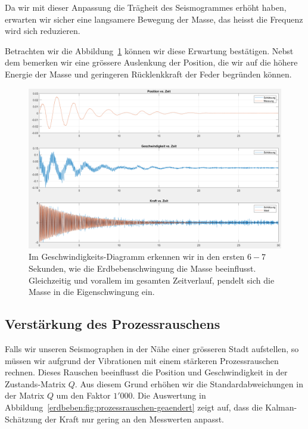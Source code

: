 Da wir mit dieser Anpassung die Trägheit des Seismogrammes erhöht haben, erwarten wir sicher eine langsamere Bewegung der Masse, das heisst die Frequenz wird sich reduzieren.

Betrachten wir die Abbildung~\ref{erdbeben:fig:systemparameter-geaendert} können wir diese Erwartung bestätigen.
Nebst dem bemerken wir eine grössere Auslenkung der Position, die wir auf die höhere Energie der Masse und geringeren Rücklenkkraft der Feder begründen können.

\begin{figure}
	\begin{center}
		\includegraphics[width=\linewidth,keepaspectratio]{papers/erdbeben/Systemparameter_geaendert_2.PNG}
		\caption{Im Geschwindigkeits-Diagramm erkennen wir in den ersten $6-7$ Sekunden, wie die Erdbebenschwingung die Masse beeinflusst. Gleichzeitig und vorallem im gesamten Zeitverlauf, pendelt sich die Masse in die Eigenschwingung ein.}
    \label{erdbeben:fig:systemparameter-geaendert}
	\end{center}
\end{figure}


\subsection{Verstärkung des Prozessrauschens}
Falls wir unseren Seismographen in der Nähe einer grösseren Stadt aufstellen, so müssen wir aufgrund der Vibrationen mit einem stärkeren Prozessrauschen rechnen.
Dieses Rauschen beeinflusst die Position und Geschwindigkeit in der Zustands-Matrix $Q$.
Aus diesem Grund erhöhen wir die Standardabweichungen in der Matrix $Q$ um den Faktor $1'000$.
Die Auswertung in Abbildung~\ref{erdbeben:fig:prozessrauschen-geaendert} zeigt auf, dass die Kalman-Schätzung der Kraft nur gering an den Messwerten anpasst.

